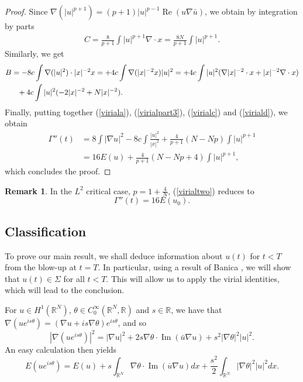 \documentclass[reqno]{amsart}
\newcommand{\real}{\mathbb{R}}
\newcommand{\rn}{\real^N}
\newcommand{\R}{\mathbb{R}}
\DeclareMathOperator \im{Im}
\DeclareMathOperator \re{Re}
\theoremstyle{plain}
\theoremstyle{definition}
\newtheorem{remark}{Remark}
\numberwithin{equation}{section}
\begin{document}
\begin{proof}
Since $\nabla(|u|^{p+1})=(p+1)|u|^{p-1}\re(u\nabla\bar{u})$, we obtain by integration by parts
\begin{align}
C=\frac{8}{p+1}\int|u|^{p+1}\nabla\cdot x=\frac{8N}{p+1}\int|u|^{p+1}.\label{virialc}
\end{align}
Similarly, we get
\begin{align}
B&=-8c\int \nabla(|u|^2)\cdot|x|^{-2}x=+4c\int \nabla(|x|^{-2}x)|u|^2=+4c\int|u|^2(\nabla|x|^{-2}\cdot x+|x|^{-2}\nabla \cdot x) \notag
\\
&\phantom{=}+4c\int|u|^2(-2|x|^{-2}+N|x|^{-2}).\label{viriald}
\end{align}
Finally, putting together (\ref{viriala}), (\ref{virialpart3}), (\ref{virialc}) and (\ref{viriald}), we obtain
\[
\begin{split}
\Gamma''(t)&=8\int|\nabla u|^2-8c\int\frac{|u|^2}{|x|^2}+\frac{4}{p+1}(N-Np)\int|u|^{p+1}
\\
&=16E(u)+\frac{4}{p+1}(N-Np+4)\int|u|^{p+1},
\end{split}
\]
which concludes the proof. 
\end{proof}

\begin{remark} In the $L^2$ critical case, $p=1+\frac{4}{N}$, 
(\ref{virialtwo}) reduces to
\begin{equation}\label{virialthree}
\Gamma''(t)=16E(u_0).
\end{equation}
\end{remark}


\subsection{Classification}
To prove our main result, we shall deduce information about $u(t)$ for $t<T$ from the
blow-up at $t=T$. In particular, using a result of Banica \cite{banica}, we will show
that $u(t)\in\Sigma$ for all $t<T$. This will allow us to apply the virial identities, which will
lead to the conclusion.

For $u\in H^1(\rn)$, $\theta \in C_0^\infty(\rn,\R)$ and $s\in \R$, 
we have that $\nabla(ue^{is\theta})=(\nabla u + is\nabla\theta)e^{is\theta}$, and so
\[
|\nabla(ue^{is\theta})|^2=|\nabla u|^2+2s\nabla\theta\cdot\im(\bar{u}\nabla u)+s^2|\nabla\theta|^2|u|^2.
\]
An easy calculation then yields
\begin{equation}\label{valeria}
E(ue^{is\theta})=E(u)+s\int_{\rn}\nabla \theta\cdot \im(\overline{u}\nabla u)dx 
+ \frac{s^2}{2}\int_{\rn}|\nabla\theta|^2|u|^2dx.
\end{equation}
\end{document}
